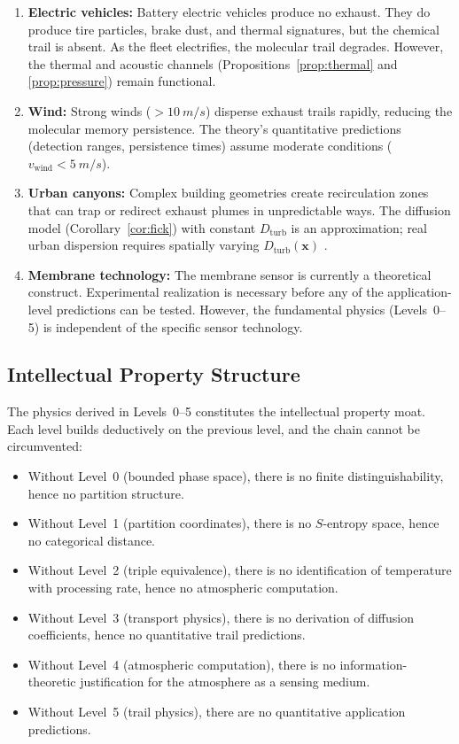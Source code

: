 \documentclass[11pt,twocolumn,a4paper]{article}
\theoremstyle{plain}
\theoremstyle{definition}
\theoremstyle{remark}
\newcommand{\Dturb}{D_{\mathrm{turb}}}
\begin{document}
\begin{enumerate}[nosep]
    \item \textbf{Electric vehicles:} Battery electric vehicles produce no exhaust. They do produce tire particles, brake dust, and thermal signatures, but the chemical trail is absent. As the fleet electrifies, the molecular trail degrades. However, the thermal and acoustic channels (Propositions~\ref{prop:thermal} and \ref{prop:pressure}) remain functional.

    \item \textbf{Wind:} Strong winds ($> \SI{10}{m/s}$) disperse exhaust trails rapidly, reducing the molecular memory persistence. The theory's quantitative predictions (detection ranges, persistence times) assume moderate conditions ($v_{\mathrm{wind}} < \SI{5}{m/s}$).

    \item \textbf{Urban canyons:} Complex building geometries create recirculation zones that can trap or redirect exhaust plumes in unpredictable ways. The diffusion model (Corollary~\ref{cor:fick}) with constant $\Dturb$ is an approximation; real urban dispersion requires spatially varying $\Dturb(\mathbf{x})$ \cite{carpentieri2012wind}.

    \item \textbf{Membrane technology:} The membrane sensor \cite{sachikonye2026membrane} is currently a theoretical construct. Experimental realization is necessary before any of the application-level predictions can be tested. However, the fundamental physics (Levels~0--5) is independent of the specific sensor technology.
\end{enumerate}

\subsection{Intellectual Property Structure}

The physics derived in Levels~0--5 constitutes the intellectual property moat. Each level builds deductively on the previous level, and the chain cannot be circumvented:

\begin{itemize}[nosep]
    \item Without Level~0 (bounded phase space), there is no finite distinguishability, hence no partition structure.
    \item Without Level~1 (partition coordinates), there is no $S$-entropy space, hence no categorical distance.
    \item Without Level~2 (triple equivalence), there is no identification of temperature with processing rate, hence no atmospheric computation.
    \item Without Level~3 (transport physics), there is no derivation of diffusion coefficients, hence no quantitative trail predictions.
    \item Without Level~4 (atmospheric computation), there is no information-theoretic justification for the atmosphere as a sensing medium.
    \item Without Level~5 (trail physics), there are no quantitative application predictions.
\end{itemize}
\end{document}
